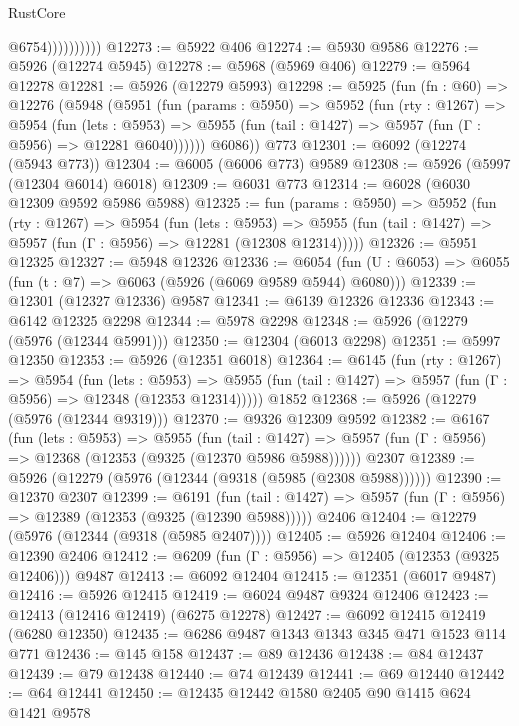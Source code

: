 \begin{lexlean}{RustCore}
\begin{coremodule}
                        @6754))))))))))
@12273 := @5922 @406
@12274 := @5930 @9586
@12276 := @5926 (@12274 @5945)
@12278 := @5968 (@5969 @406)
@12279 := @5964 @12278
@12281 := @5926 (@12279 @5993)
@12298 := @5925
    (fun (fn : @60) =>
    @12276
      (@5948
        (@5951
          (fun (params : @5950) =>
          @5952
            (fun (rty : @1267) =>
            @5954
              (fun (lets : @5953) =>
              @5955 (fun (tail : @1427) => @5957 (fun (Γ : @5956) => @12281 @6040))))))
        @6086))
    @773
@12301 := @6092 (@12274 (@5943 @773))
@12304 := @6005 (@6006 @773) @9589
@12308 := @5926 (@5997 (@12304 @6014) @6018)
@12309 := @6031 @773
@12314 := @6028 (@6030 @12309 @9592 @5986 @5988)
@12325 := fun (params : @5950) =>
  @5952
    (fun (rty : @1267) =>
    @5954
      (fun (lets : @5953) =>
      @5955 (fun (tail : @1427) => @5957 (fun (Γ : @5956) => @12281 (@12308 @12314)))))
@12326 := @5951 @12325
@12327 := @5948 @12326
@12336 := @6054 (fun (U : @6053) => @6055 (fun (t : @7) => @6063 (@5926 (@6069 @9589 @5944) @6080)))
@12339 := @12301 (@12327 @12336) @9587
@12341 := @6139 @12326 @12336
@12343 := @6142 @12325 @2298
@12344 := @5978 @2298
@12348 := @5926 (@12279 (@5976 (@12344 @5991)))
@12350 := @12304 (@6013 @2298)
@12351 := @5997 @12350
@12353 := @5926 (@12351 @6018)
@12364 := @6145
    (fun (rty : @1267) =>
    @5954
      (fun (lets : @5953) =>
      @5955 (fun (tail : @1427) => @5957 (fun (Γ : @5956) => @12348 (@12353 @12314)))))
    @1852
@12368 := @5926 (@12279 (@5976 (@12344 @9319)))
@12370 := @9326 @12309 @9592
@12382 := @6167
    (fun (lets : @5953) =>
    @5955
      (fun (tail : @1427) =>
      @5957 (fun (Γ : @5956) => @12368 (@12353 (@9325 (@12370 @5986 @5988))))))
    @2307
@12389 := @5926 (@12279 (@5976 (@12344 (@9318 (@5985 (@2308 @5988))))))
@12390 := @12370 @2307
@12399 := @6191
    (fun (tail : @1427) => @5957 (fun (Γ : @5956) => @12389 (@12353 (@9325 (@12390 @5988)))))
    @2406
@12404 := @12279 (@5976 (@12344 (@9318 (@5985 @2407))))
@12405 := @5926 @12404
@12406 := @12390 @2406
@12412 := @6209 (fun (Γ : @5956) => @12405 (@12353 (@9325 @12406))) @9487
@12413 := @6092 @12404
@12415 := @12351 (@6017 @9487)
@12416 := @5926 @12415
@12419 := @6024 @9487 @9324 @12406
@12423 := @12413 (@12416 @12419) (@6275 @12278)
@12427 := @6092 @12415 @12419 (@6280 @12350)
@12435 := @6286 @9487 @1343 @1343 @345 @471 @1523 @114 @771
@12436 := @145 @158
@12437 := @89 @12436
@12438 := @84 @12437
@12439 := @79 @12438
@12440 := @74 @12439
@12441 := @69 @12440
@12442 := @64 @12441
@12450 := @12435 @12442 @1580 @2405 @90 @1415 @624 @1421 @9578

\end{coremodule}
\end{lexlean}
